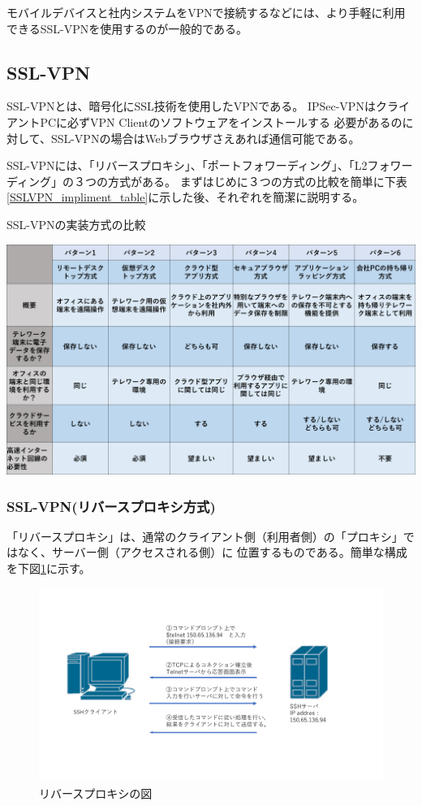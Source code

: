 \documentclass[11pt,a4j,titlepage]{jreport}
\begin{document}
モバイルデバイスと社内システムをVPNで接続するなどには、より手軽に利用できるSSL-VPNを使用するのが一般的である。


\subsection{SSL-VPN}
SSL-VPNとは、暗号化にSSL技術を使用したVPNである。
IPSec-VPNはクライアントPCに必ずVPN Clientのソフトウェアをインストールする
必要があるのに対して、SSL-VPNの場合はWebブラウザさえあれば通信可能である。

SSL-VPNには、「リバースプロキシ」、「ポートフォワーディング」、「L2フォワーディング」の３つの方式がある。
まずはじめに３つの方式の比較を簡単に下表\ref{SSLVPN_impliment_table}に示した後、それぞれを簡潔に説明する。

\begin{table}[h]
    \centering
    \caption{SSL-VPNの実装方式の比較}
    \includegraphics[width=1.0\textwidth, page=3]{graphs/telework_list.pdf}
    \label{SSLVPN_impliment_table}
\end{table}

\subsubsection*{SSL-VPN(リバースプロキシ方式)}

「リバースプロキシ」は、通常のクライアント側（利用者側）の「プロキシ」ではなく、サーバー側（アクセスされる側）に
位置するものである。簡単な構成を下図\ref{reverse_proxy}に示す。

\begin{figure}[h]
    \centering
    \includegraphics[width=1.0\textwidth, page=16]{graphs/network_archtecture.pdf}
    \caption{リバースプロキシの図}
    \label{reverse_proxy}
\end{figure}
\end{document}
